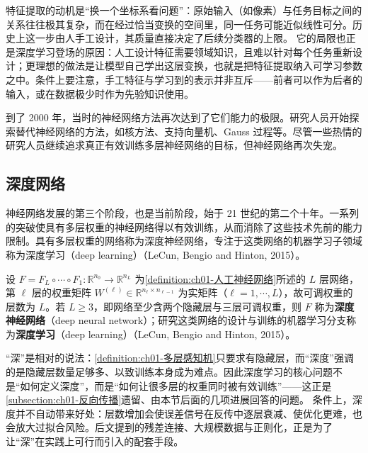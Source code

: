 \documentclass[../../main.tex]{subfiles}
\begin{document}
\begin{remark}
特征提取的动机是“换一个坐标系看问题”：原始输入（如像素）与任务目标之间的关系往往极其复杂，而在经过恰当变换的空间里，同一任务可能近似线性可分。历史上这一步由人手工设计，其质量直接决定了后续分类器的上限。
它的局限也正是深度学习登场的原因：人工设计特征需要领域知识，且难以针对每个任务重新设计；更理想的做法是让模型自己学出这层变换，也就是把特征提取纳入可学习参数之中。条件上要注意，手工特征与学习到的表示并非互斥——前者可以作为后者的输入，或在数据极少时作为先验知识使用。
\end{remark}

到了 2000 年，当时的神经网络方法再次达到了它们能力的极限。研究人员开始探索替代神经网络的方法，如核方法、支持向量机、Gauss 过程等。尽管一些热情的研究人员继续追求真正有效训练多层神经网络的目标，但神经网络再次失宠。

\subsection{深度网络}\label{subsection:ch01-深度网络}

神经网络发展的第三个阶段，也是当前阶段，始于 21 世纪的第二个十年。一系列的突破使具有多层权重的神经网络得以有效训练，从而消除了这些技术先前的能力限制。具有多层权重的网络称为深度神经网络，专注于这类网络的机器学习子领域称为深度学习（deep learning）（LeCun, Bengio and Hinton, 2015）。

\begin{definition}[深度神经网络与深度学习]\label{definition:ch01-深度神经网络与深度学习}
设 $F=F_{L}\circ\cdots\circ F_{1}:\mathbb{R}^{n_{0}}\to\mathbb{R}^{n_{L}}$ 为\cref{definition:ch01-人工神经网络}所述的 $L$ 层网络，第 $\ell$ 层的权重矩阵 $W^{(\ell)}\in\mathbb{R}^{n_{\ell}\times n_{\ell-1}}$ 为实矩阵（$\ell=1,\cdots,L$），故可调权重的层数为 $L$。若 $L\geqslant3$，即网络至少含两个隐藏层与三层可调权重，则 $F$ 称为\textbf{深度神经网络}（deep neural network）；研究这类网络的设计与训练的机器学习分支称为\textbf{深度学习}（deep learning）（LeCun, Bengio and Hinton, 2015）。
\end{definition}

\begin{remark}
“深”是相对的说法：\cref{definition:ch01-多层感知机}只要求有隐藏层，而“深度”强调的是隐藏层数量足够多、以致训练本身成为难点。因此深度学习的核心问题不是“如何定义深度”，而是“如何让很多层的权重同时被有效训练”——这正是\cref{subsection:ch01-反向传播}遗留、由本节后面的几项进展回答的问题。
条件上，深度并不自动带来好处：层数增加会使误差信号在反传中逐层衰减、使优化更难，也会放大过拟合风险。后文提到的残差连接、大规模数据与正则化，正是为了让“深”在实践上可行而引入的配套手段。
\end{remark}
\end{document}
